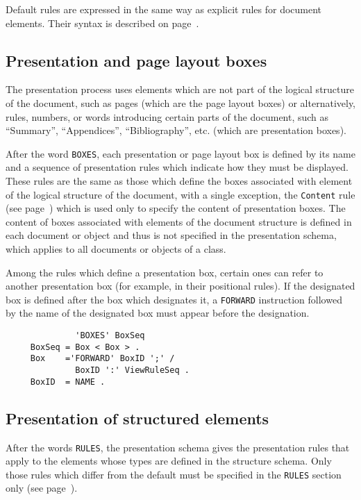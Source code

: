 Default rules are expressed in the same way as explicit rules for
document elements.  Their syntax is described on
page~\pageref{reglepres}.

\subsection{Presentation and page layout boxes}

The presentation process uses elements which are not part of the
logical structure of the document, such as pages (which are the page
layout boxes) or alternatively, rules, numbers, or words introducing
certain parts of the document, such as ``Summary'', ``Appendices'',
``Bibliography'', etc. (which are presentation boxes).

After the word {\tt BOXES}, each presentation or page layout box is
defined by its name and a sequence of presentation rules which
indicate how they must be displayed.  These rules are the same as
those which define the boxes associated with element of the logical
structure of the document, with a single exception, the {\tt Content}
rule (see page~\pageref{content}) which is used only to specify the
content of presentation boxes.  The content of boxes associated with
elements of the document structure is defined in each document or
object and thus is not specified in the presentation schema, which
applies to all documents or objects of a class.

Among the rules which define a presentation box, certain ones can
refer to another presentation box (for example, in their positional
rules).  If the designated box is defined after the box which
designates it, a {\tt FORWARD} instruction followed by the name of the
designated box must appear before the designation.

\begin{verbatim}
              'BOXES' BoxSeq
     BoxSeq = Box < Box > .
     Box    ='FORWARD' BoxID ';' /
              BoxID ':' ViewRuleSeq .
     BoxID  = NAME .
\end{verbatim}

\subsection{Presentation of structured elements}

After the words {\tt RULES}, the presentation schema gives the
presentation rules that apply to the elements whose types are defined
in the structure schema.  Only those rules which differ from the
default must be specified in the {\tt RULES} section only (see
page~\pageref{reglesdefaut}).

